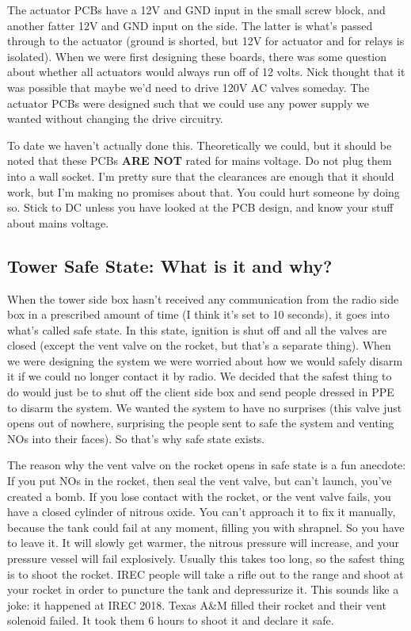 \documentclass[11pt]{article}
\begin{document}
The actuator PCBs have a 12V and GND input in the small screw block, and
another fatter 12V and GND input on the side. The latter is what's passed
through to the actuator (ground is shorted, but 12V for actuator and for
relays is isolated). When we were first designing these boards, there was
some question about whether all actuators would always run off of 12
volts. Nick thought that it was possible that maybe we'd need to drive 120V
AC valves someday. The actuator PCBs were designed such that we could use
any power supply we wanted without changing the drive circuitry.

To date we haven't actually done this. Theoretically we could, but it
should be noted that these PCBs \textbf{ARE NOT} rated for mains voltage. Do not
plug them into a wall socket. I'm pretty sure that the clearances are
enough that it should work, but I'm making no promises about that. You
could hurt someone by doing so. Stick to DC unless you have looked at the
PCB design, and know your stuff about mains voltage.

\subsection{Tower Safe State: What is it and why?}
\label{sec:org756b911}

When the tower side box hasn't received any communication from the radio
side box in a prescribed amount of time (I think it's set to 10 seconds),
it goes into what's called safe state. In this state, ignition is shut off
and all the valves are closed (except the vent valve on the rocket, but
that's a separate thing). When we were designing the system we were worried
about how we would safely disarm it if we could no longer contact it by
radio. We decided that the safest thing to do would just be to shut off the
client side box and send people dressed in PPE to disarm the system. We
wanted the system to have no surprises (this valve just opens out of
nowhere, surprising the people sent to safe the system and venting NOs into
their faces). So that's why safe state exists.

The reason why the vent valve on the rocket opens in safe state is a fun
anecdote: If you put NOs in the rocket, then seal the vent valve, but can't
launch, you've created a bomb. If you lose contact with the rocket, or the
vent valve fails, you have a closed cylinder of nitrous oxide. You can't
approach it to fix it manually, because the tank could fail at any moment,
filling you with shrapnel. So you have to leave it. It will slowly get
warmer, the nitrous pressure will increase, and your pressure vessel will
fail explosively. Usually this takes too long, so the safest thing is to
shoot the rocket. IREC people will take a rifle out to the range and shoot
at your rocket in order to puncture the tank and depressurize it. This
sounds like a joke: it happened at IREC 2018. Texas A\&M filled their rocket
and their vent solenoid failed. It took them 6 hours to shoot it and
declare it safe.
\end{document}
